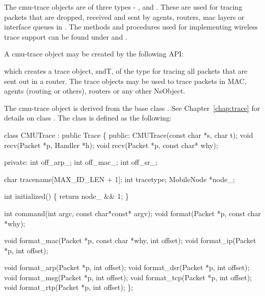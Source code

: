 The cmu-trace objects are of three types - ,
 and . These are used for tracing
packets that are dropped, received and sent by agents, routers, mac layers
or interface queues in \ns. The methods and procedures used for
implementing wireless trace support can be found under
 and .

A cmu-trace object may be created by the following API:
which creates a trace object, sndT, of the type 
for tracing all packets that are sent out in a router. The trace
objects may be used to trace packets in MAC, agents (routing or
others), routers or any other NsObject. 

The cmu-trace object  is derived from the base class
. See Chapter~\ref{chap:trace} for details on class
. The class  is defined as the following:

\begin{program}
class CMUTrace : public Trace \{
public:
        CMUTrace(const char *s, char t);
        void    recv(Packet *p, Handler *h);
        void    recv(Packet *p, const char* why);

private:
        int off_arp_;
        int off_mac_;
        int off_sr_;

        char    tracename[MAX_ID_LEN + 1];
        int     tracetype;
        MobileNode *node_;

        int initialized() \{ return node_ && 1; \}

        int     command(int argc, const char*const* argv);
        void    format(Packet *p, const char *why);

        void    format_mac(Packet *p, const char *why, int offset);
        void    format_ip(Packet *p, int offset);

        void    format_arp(Packet *p, int offset);
        void    format_dsr(Packet *p, int offset);
        void    format_msg(Packet *p, int offset);
        void    format_tcp(Packet *p, int offset);
        void    format_rtp(Packet *p, int offset);
\};
\end{program}

